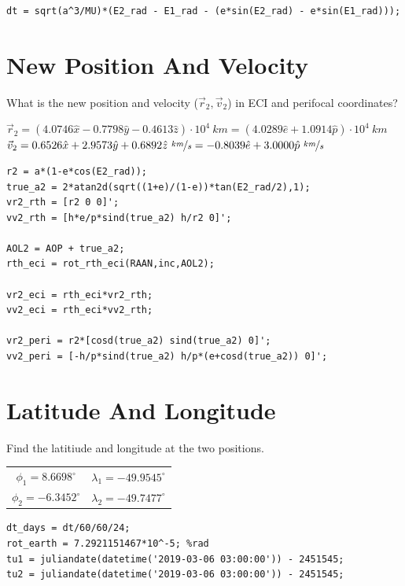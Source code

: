 \documentclass[hidelinks,12pt]{article}
\begin{document}
\begin{flushleft}
\begin{lstlisting}[frame=lines,style=Matlab-editor,basicstyle = \mlttfamily]
dt = sqrt(a^3/MU)*(E2_rad - E1_rad - (e*sin(E2_rad) - e*sin(E1_rad)));
\end{lstlisting}
\section{New Position And Velocity}
What is the new position and velocity ($\vec{r}_2, \vec{v}_2$) in ECI and perifocal coordinates?\\
\begin{center}
  $\vec{r}_2 = (4.0746 \hat{x} -0.7798 \hat{y} -0.4613 \hat{z})\cdot 10^4~km = (4.0289 \hat{e} + 1.0914 \hat{p})\cdot 10^4~km$\\
  $\vec{v}_2 = 0.6526 \hat{x} + 2.9573 \hat{y} + 0.6892 \hat{z}~\nicefrac{km}{s} = -0.8039 \hat{e} + 3.0000 \hat{p}~\nicefrac{km}{s}$
\end{center}
\begin{lstlisting}[frame=lines,style=Matlab-editor,basicstyle = \mlttfamily]
% 3. What is the new position and velocity in ECI and perifocal coordinates?
r2 = a*(1-e*cos(E2_rad));
true_a2 = 2*atan2d(sqrt((1+e)/(1-e))*tan(E2_rad/2),1);
vr2_rth = [r2 0 0]';
vv2_rth = [h*e/p*sind(true_a2) h/r2 0]';

AOL2 = AOP + true_a2;
rth_eci = rot_rth_eci(RAAN,inc,AOL2);

vr2_eci = rth_eci*vr2_rth;
vv2_eci = rth_eci*vv2_rth;

vr2_peri = r2*[cosd(true_a2) sind(true_a2) 0]';
vv2_peri = [-h/p*sind(true_a2) h/p*(e+cosd(true_a2)) 0]';
\end{lstlisting}
\section{Latitude And Longitude}
Find the latitiude and longitude at the two positions.\\
\begin{center}
  \begin{tabular}{cc}
    $\phi_1 = 8.6698^\circ$ & $\lambda_1 = -49.9545^\circ$\\
    $\phi_2 = -6.3452^\circ$ & $\lambda_2 = -49.7477^\circ$
  \end{tabular}
\end{center}
\begin{lstlisting}[frame=lines,style=Matlab-editor,basicstyle = \mlttfamily]
% 4. Find the latitiude and longitide at the two positions
dt_days = dt/60/60/24;
rot_earth = 7.2921151467*10^-5; %rad
tu1 = juliandate(datetime('2019-03-06 03:00:00')) - 2451545;
tu2 = juliandate(datetime('2019-03-06 03:00:00')) - 2451545;


\end{lstlisting}
\end{flushleft}
\end{document}
